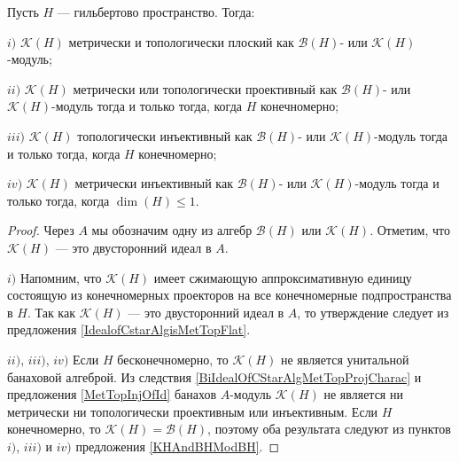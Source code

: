 \begin{proposition}\label{KHAndBHModKH} Пусть $H$ --- гильбертово пространство. Тогда:

$i)$ $\mathcal{K}(H)$ метрически и топологически плоский как $\mathcal{B}(H)$- или $\mathcal{K}(H)$-модуль;

$ii)$ $\mathcal{K}(H)$ метрически или топологически проективный как $\mathcal{B}(H)$- или $\mathcal{K}(H)$-модуль тогда и только тогда, когда $H$ конечномерно;

$iii)$ $\mathcal{K}(H)$ топологически инъективный как $\mathcal{B}(H)$- или $\mathcal{K}(H)$-модуль тогда и только тогда, когда $H$ конечномерно;

$iv)$ $\mathcal{K}(H)$ метрически инъективный как $\mathcal{B}(H)$- или $\mathcal{K}(H)$-модуль тогда и только тогда, когда $\dim(H)\leq 1$.
\end{proposition}
\begin{proof} Через $A$ мы обозначим одну из алгебр $\mathcal{B}(H)$ или $\mathcal{K}(H)$. Отметим, что $\mathcal{K}(H)$ --- это двусторонний идеал в $A$. 

$i)$ Напомним, что $\mathcal{K}(H)$ имеет сжимающую аппроксимативную единицу состоящую из конечномерных проекторов на все конечномерные подпространства в $H$. Так как $\mathcal{K}(H)$ --- это двусторонний идеал в $A$, то утверждение следует из предложения \ref{IdealofCstarAlgisMetTopFlat}.

$ii)$, $iii)$, $iv)$ Если $H$ бесконечномерно, то $\mathcal{K}(H)$ не является унитальной банаховой алгеброй. Из следствия \ref{BiIdealOfCStarAlgMetTopProjCharac} и предложения \ref{MetTopInjOfId} банахов $A$-модуль $\mathcal{K}(H)$ не является ни метрически ни топологически проективным или инъективным. Если $H$ конечномерно, то $\mathcal{K}(H)=\mathcal{B}(H)$, поэтому оба результата следуют из пунктов $i)$, $iii)$ и $iv)$ предложения \ref{KHAndBHModBH}.
\end{proof}

